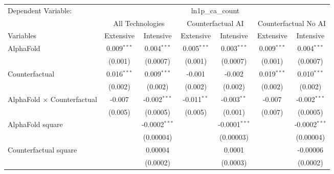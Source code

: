 \begingroup
\centering
\begin{tabular}{lcccccc}
   \tabularnewline \midrule \midrule
   Dependent Variable: & \multicolumn{6}{c}{ln1p\_ca\_count}\\
 & \multicolumn{2}{c}{All Technologies} & \multicolumn{2}{c}{Counterfactual AI} & \multicolumn{2}{c}{Counterfactual No AI} \\
\cmidrule(lr){1-1}\cmidrule(lr){2-3} \cmidrule(lr){4-5} \cmidrule(lr){6-7}
Variables & \multicolumn{1}{c}{Extensive} & \multicolumn{1}{c}{Intensive} & \multicolumn{1}{c}{Extensive} & \multicolumn{1}{c}{Intensive} & \multicolumn{1}{c}{Extensive} & \multicolumn{1}{c}{Intensive} \\
\cmidrule(lr){1-1}\cmidrule(lr){2-2} \cmidrule(lr){3-3} \cmidrule(lr){4-4} \cmidrule(lr){5-5} \cmidrule(lr){6-6} \cmidrule(lr){7-7}
   AlphaFold                          & 0.009$^{***}$ & 0.004$^{***}$    & 0.005$^{***}$ & 0.003$^{***}$   & 0.009$^{***}$ & 0.004$^{***}$\\   
                                      & (0.001)       & (0.0007)         & (0.001)       & (0.0007)        & (0.001)       & (0.0007)\\   
   Counterfactual                     & 0.016$^{***}$ & 0.009$^{***}$    & -0.001        & -0.002          & 0.019$^{***}$ & 0.010$^{***}$\\   
                                      & (0.002)       & (0.002)          & (0.002)       & (0.002)         & (0.002)       & (0.002)\\   
   AlphaFold $\times$ Counterfactual  & -0.007        & -0.002$^{***}$   & -0.011$^{**}$ & -0.003$^{**}$   & -0.007        & -0.002$^{***}$\\   
                                      & (0.005)       & (0.0005)         & (0.005)       & (0.001)         & (0.007)       & (0.0005)\\   
   AlphaFold square                   &               & -0.0002$^{***}$  &               & -0.0001$^{***}$ &               & -0.0002$^{***}$\\   
                                      &               & (0.00004)        &               & (0.00003)       &               & (0.00004)\\   
   Counterfactual square              &               & 0.00004          &               & 0.0001          &               & -0.00006\\   
                                      &               & (0.0002)         &               & (0.0003)        &               & (0.0002)\\   

\end{tabular}
